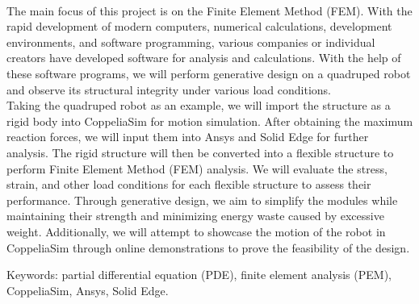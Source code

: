 \renewcommand{\baselinestretch}{1.5} %
\begin{center}
\LARGE\textbf{}\\
\end{center}
\begin{flushleft}
\fontsize{14pt}{16pt}\sectionef\hspace{12pt}\quad The main focus of this project is on the Finite Element Method (FEM). With the rapid development of modern computers, numerical calculations, development environments, and software programming, various companies or individual creators have developed software for analysis and calculations. With the help of these software programs, we will perform generative design on a quadruped robot and observe its structural integrity under various load conditions.\\[12pt]

\fontsize{14pt}{16pt}\sectionef\hspace{12pt}\quad Taking the quadruped robot as an example, we will import the structure as a rigid body into CoppeliaSim for motion simulation. After obtaining the maximum reaction forces, we will input them into Ansys and Solid Edge for further analysis. The rigid structure will then be converted into a flexible structure to perform Finite Element Method (FEM) analysis. We will evaluate the stress, strain, and other load conditions for each flexible structure to assess their performance. Through generative design, we aim to simplify the modules while maintaining their strength and minimizing energy waste caused by excessive weight. Additionally, we will attempt to showcase the motion of the robot in CoppeliaSim through online demonstrations to prove the feasibility of the design.\\
\end{flushleft}
\begin{center}
\vspace{3cm}
\fontsize{14pt}{16pt}\selectfont\sectionef Keywords: partial differential equation (PDE), finite element analysis (PEM), CoppeliaSim, Ansys, Solid Edge.
\end{center}

